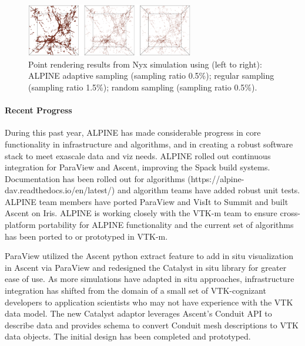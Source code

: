 \begin{figure}[htb]
	\begin{center}
		\includegraphics[width=0.65\textwidth]{projects/2.3.4-DataViz/2.3.4.16-ALPINE-ZFP/alpine_nyxSamplingExample.png}
		\caption{Point rendering results from Nyx simulation using (left to right):  ALPINE adaptive sampling  (sampling ratio 0.5\%); regular sampling  (sampling ratio 1.5\%); random sampling  (sampling ratio 0.5\%).}
		\label{fig:alpine-sampling-example}
	\end{center}
\end{figure}

\paragraph{Recent Progress}

During this past year, ALPINE has made considerable progress in core functionality in infrastructure and algorithms, and in creating a robust software stack to meet exascale data and viz needs.  ALPINE rolled out continuous integration for ParaView and Ascent, improving the Spack build systems.  Documentation has been rolled out for algorithms (https://alpine-dav.readthedocs.io/en/latest/) and algorithm teams have added robust unit tests.  ALPINE team members have ported ParaView and VisIt to Summit and built Ascent on Iris.  ALPINE is working closely with the VTK-m team to ensure cross-platform portability for ALPINE functionality and the current set of algorithms has been ported to or prototyped in VTK-m.   

ParaView utilized the Ascent python extract feature to add in situ visualization in Ascent via ParaView and redesigned the Catalyst in situ library for greater ease of use.  As more simulations have adapted in situ approaches, infrastructure integration has shifted from the domain of a small set of VTK-cognizant developers to application scientists who may not have experience with the VTK data model.  
The new Catalyst adaptor leverages Ascent's Conduit API to describe data and provides schema to convert Conduit mesh descriptions to VTK data objects.  The initial design has been completed and prototyped.  

